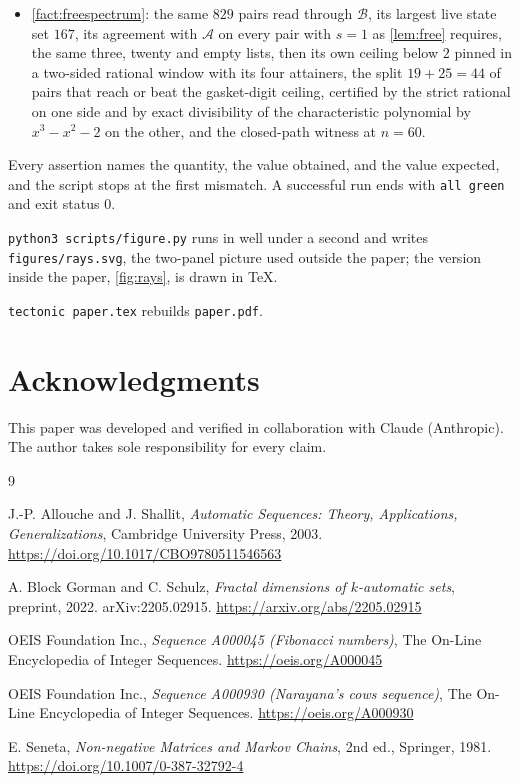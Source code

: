 \documentclass[11pt]{amsart}
\theoremstyle{definition}
\theoremstyle{remark}
\begin{document}
\begin{itemize}
\item \cref{fact:freespectrum}: the same $829$ pairs read through $\mathcal{B}$, its largest live state set $167$, its agreement with $\mathcal{A}$ on every pair with $s=1$ as \cref{lem:free} requires, the same three, twenty and empty lists, then its own ceiling below $2$ pinned in a two-sided rational window with its four attainers, the split $19+25=44$ of pairs that reach or beat the gasket-digit ceiling, certified by the strict rational on one side and by exact divisibility of the characteristic polynomial by $x^3-x^2-2$ on the other, and the closed-path witness at $n=60$.
\end{itemize}
Every assertion names the quantity, the value obtained, and the value expected, and the script stops at the first mismatch. A successful run ends with \texttt{all green} and exit status $0$.

\texttt{python3 scripts/figure.py} runs in well under a second and writes \texttt{figures/rays.svg}, the two-panel picture used outside the paper; the version inside the paper, \cref{fig:rays}, is drawn in \TeX.

\texttt{tectonic paper.tex} rebuilds \texttt{paper.pdf}.

\section*{Acknowledgments}

This paper was developed and verified in collaboration with Claude (Anthropic). The author takes sole responsibility for every claim.

\begin{thebibliography}{9}

J.-P. Allouche and J. Shallit, \emph{Automatic Sequences: Theory, Applications,
Generalizations}, Cambridge University Press, 2003. \url{https://doi.org/10.1017/CBO9780511546563}

A. Block Gorman and C. Schulz, \emph{Fractal dimensions of $k$-automatic sets}, preprint, 2022. arXiv:2205.02915. \url{https://arxiv.org/abs/2205.02915}

OEIS Foundation Inc., \emph{Sequence A000045 (Fibonacci numbers)}, The On-Line Encyclopedia of Integer Sequences. \href{https://oeis.org/A000045}{https://oeis.org/A000045}

OEIS Foundation Inc., \emph{Sequence A000930 (Narayana's cows sequence)}, The On-Line Encyclopedia of Integer Sequences. \href{https://oeis.org/A000930}{https://oeis.org/A000930}

E. Seneta, \emph{Non-negative Matrices and Markov Chains}, 2nd ed., Springer, 1981. \url{https://doi.org/10.1007/0-387-32792-4}

\end{thebibliography}
\end{document}
